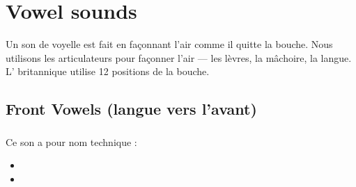 \chapter{Vowel sounds}\label{chap:vow}



Un son de voyelle est fait en façonnant l'air comme il quitte la
bouche. Nous utilisons les articulateurs pour façonner l'air --- les
lèvres, la mâchoire, la langue. L' britannique utilise 12 positions de la bouche.

\newpage
\minitoc
\newpage

\section{Front Vowels (langue vers l'avant)}\label{sec:frontvow}




\subsection{}\label{subsec:ilong}

Ce son a pour nom technique :

\begin{itemize}
\item {}
\item {}
\end{itemize}

\indicsound



